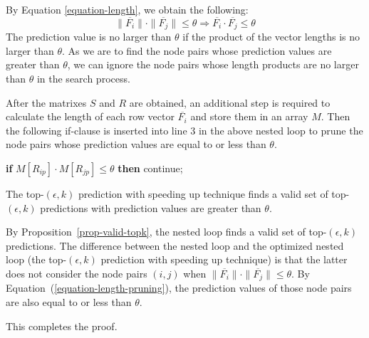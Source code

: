 By Equation \ref{equation-length}, we obtain the following:
\begin{equation}
\label{equation-length-pruning}
\|\overline{F_i} \| \cdot \| \overline{F_j} \| \leq \theta \Longrightarrow \overline{F_i} \cdot \overline{F_j} \leq \theta
\end{equation}
The prediction value is no larger than $\theta$ if the product of the vector lengths  is no larger than $\theta$.
As we are to find the node pairs whose prediction values are greater than $\theta$, we can ignore
the node pairs whose length products are no larger than $\theta$ in the search process.

After  the matrixes $S$ and $R$ are obtained, an additional step is required to calculate the length of each row
vector $\overline{F_i}$ and store them in an array $M$. Then the following if-clause is inserted  into line 3
in the above nested loop to prune the node pairs whose prediction values are equal to or less than $\theta$.
\begin{tabbing}\hspace{5ex}\=
{\bf if} $M[R_{ip}] \cdot M[R_{jp}] \leq \theta$ {\bf then} continue;
\end{tabbing}



\begin{prop}
The top-$(\epsilon, k)$ prediction with speeding up technique finds a valid set of top-$(\epsilon, k)$
predictions with prediction values are greater than $\theta$.
\end{prop}
\begin{IEEEproof}
By Proposition~\ref{prop-valid-topk}, the nested loop finds a valid set of
top-$(\epsilon, k)$ predictions. The difference between the nested loop
and the optimized nested loop (\ie the top-$(\epsilon, k)$ prediction with speeding up technique)
is that the latter does not consider the node pairs $(i, j)$
when $\|\overline{F_i} \| \cdot \| \overline{F_j} \| \leq \theta$.
By Equation~(\ref{equation-length-pruning}), the prediction values of those node pairs
are also  equal to or less than $\theta$.

This completes the proof.
\end{IEEEproof}


